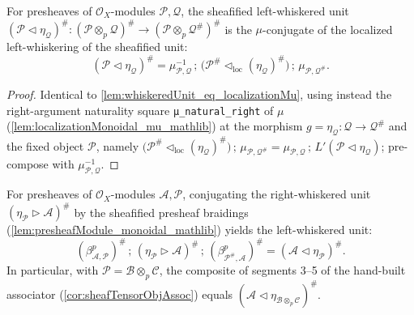 \begin{lemma}
  \label{lem:whiskeredUnitLeft_eq_localizationMu}
  For presheaves of \(\mathcal{O}_X\)-modules \(\mathcal{P}, \mathcal{Q}\), the
  sheafified left-whiskered unit
  \((\mathcal{P} \lhd \eta_{\mathcal{Q}})^{\#} :
    (\mathcal{P} \otimes_p \mathcal{Q})^{\#}
    \to (\mathcal{P} \otimes_p \mathcal{Q}^{\#})^{\#}\)
  is the \(\mu\)-conjugate of the localized left-whiskering of the sheafified unit:
  \[
    (\mathcal{P} \lhd \eta_{\mathcal{Q}})^{\#}
      = \mu_{\mathcal{P},\mathcal{Q}}^{-1} \,;\,
        \bigl(\mathcal{P}^{\#} \lhd_{\mathrm{loc}} (\eta_{\mathcal{Q}})^{\#}\bigr)
        \,;\, \mu_{\mathcal{P},\mathcal{Q}^{\#}}.
  \]
\end{lemma}

\begin{proof}
  Identical to \cref{lem:whiskeredUnit_eq_localizationMu}, using instead the
  right-argument naturality square \texttt{μ\_natural\_right} of \(\mu\)
  (\cref{lem:localizationMonoidal_mu_mathlib}) at the morphism
  \(g = \eta_{\mathcal{Q}} : \mathcal{Q} \to \mathcal{Q}^{\#}\) and the fixed
  object \(\mathcal{P}\), namely
  \(\bigl(\mathcal{P}^{\#} \lhd_{\mathrm{loc}} (\eta_{\mathcal{Q}})^{\#}\bigr)
    \,;\, \mu_{\mathcal{P},\mathcal{Q}^{\#}}
    = \mu_{\mathcal{P},\mathcal{Q}} \,;\,
      L'(\mathcal{P} \lhd \eta_{\mathcal{Q}})\);
  pre-compose with \(\mu_{\mathcal{P},\mathcal{Q}}^{-1}\).
\end{proof}

\begin{lemma}
  \label{lem:sheafification_braidingConj_whiskerRightUnit}
  For presheaves of \(\mathcal{O}_X\)-modules \(\mathcal{A}, \mathcal{P}\),
  conjugating the right-whiskered unit \((\eta_{\mathcal{P}} \rhd
  \mathcal{A})^{\#}\) by the sheafified presheaf braidings
  (\cref{lem:presheafModule_monoidal_mathlib}) yields the left-whiskered unit:
  \[
    (\beta^p_{\mathcal{A},\mathcal{P}})^{\#} \,;\,
      (\eta_{\mathcal{P}} \rhd \mathcal{A})^{\#} \,;\,
      (\beta^p_{\mathcal{P}^{\#},\mathcal{A}})^{\#}
      = (\mathcal{A} \lhd \eta_{\mathcal{P}})^{\#}.
  \]
  In particular, with \(\mathcal{P} = \mathcal{B} \otimes_p \mathcal{C}\), the
  composite of segments 3--5 of the hand-built associator
  (\cref{cor:sheafTensorObjAssoc}) equals
  \((\mathcal{A} \lhd \eta_{\mathcal{B} \otimes_p \mathcal{C}})^{\#}\).
\end{lemma}

